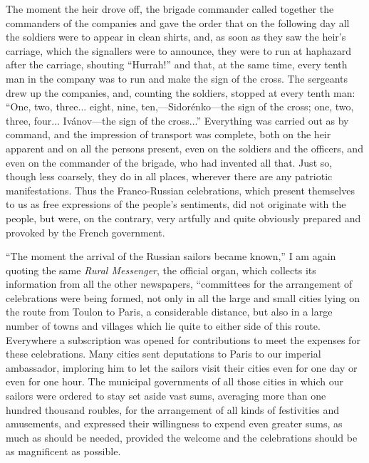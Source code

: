 \documentclass{book}
\begin{document}
The moment the heir drove off, the brigade commander called together the commanders of the companies and gave the order that on the following day all the soldiers were to appear in clean shirts, and, as soon as they saw the heir’s carriage, which the signallers were to announce, they were to run at haphazard after the carriage, shouting “Hurrah!” and that, at the same time, every tenth man in the company was to run and make the sign of the cross. The sergeants drew up the companies, and, counting the soldiers, stopped at every tenth man: “One, two, three... eight, nine, ten,—Sidorénko—the sign of the cross; one, two, three, four... Ivánov—the sign of the cross...” Everything was carried out as by command, and the impression of transport was complete, both on the heir apparent and on all the persons present, even on the soldiers and the officers, and even on the commander of the brigade, who had invented all that. Just so, though less coarsely, they do in all places, wherever there are any patriotic manifestations. Thus the Franco-Russian celebrations, which present themselves to us as free expressions of the people’s sentiments, did not originate with the people, but were, on the contrary, very artfully and quite obviously prepared and provoked by the French government.

“The moment the arrival of the Russian sailors became known,” I am again quoting the same \emph{Rural Messenger}, the official organ, which collects its information from all the other newspapers, “committees for the arrangement of celebrations were being formed, not only in all the large and small cities lying on the route from Toulon to Paris, a considerable distance, but also in a large number of towns and villages which lie quite to either side of this route. Everywhere a subscription was opened for contributions to meet the expenses for these celebrations. Many cities sent deputations to Paris to our imperial ambassador, imploring him to let the sailors visit their cities even for one day or even for one hour. The municipal governments of all those cities in which our sailors were ordered to stay set aside vast sums, averaging more than one hundred thousand roubles, for the arrangement of all kinds of festivities and amusements, and expressed their willingness to expend even greater sums, as much as should be needed, provided the welcome and the celebrations should be as magnificent as possible.
\end{document}
